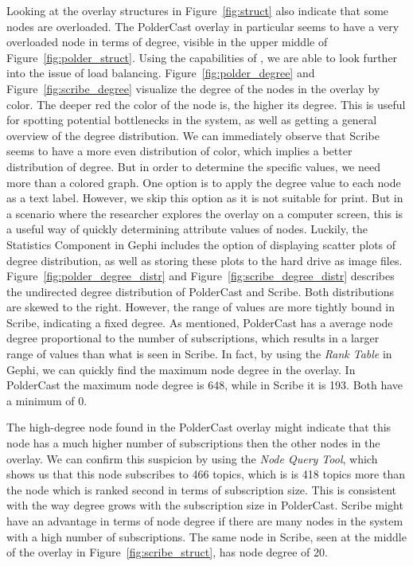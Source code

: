 Looking at the overlay structures in Figure~\ref{fig:struct} also
indicate that some nodes are overloaded. The PolderCast overlay in
particular seems to have a very overloaded node in terms of degree,
visible in the upper middle of Figure~\ref{fig:polder_struct}. Using
the capabilities of \demo{}, we are able to look further into the issue
of load balancing. Figure~\ref{fig:polder_degree} and
Figure~\ref{fig:scribe_degree} visualize the degree of the nodes in the
overlay by color. The deeper red the color of the node is, the higher
its degree. This is useful for spotting potential bottlenecks in the
system, as well as getting a general overview of the degree
distribution. We can immediately observe that Scribe seems to have a
more even distribution of color, which implies a better distribution of
degree. But in order to determine the specific values, we need more than
a colored graph. One option is to apply the degree value to each node as
a text label. However, we skip this option as it is not suitable for
print. But in a scenario where the researcher explores the overlay on a
computer screen, this is a useful way of quickly determining attribute
values of nodes. Luckily, the Statistics Component in Gephi includes the
option of displaying scatter plots of degree distribution, as well as
storing these plots to the hard drive as image files.
Figure~\ref{fig:polder_degree_distr} and
Figure~\ref{fig:scribe_degree_distr} describes the undirected degree
distribution of PolderCast and Scribe. Both distributions are skewed to
the right. However, the range of values are more tightly bound in
Scribe, indicating a fixed degree. As mentioned, PolderCast has a average node degree proportional
to the number of subscriptions, which results in a larger range of
values than what is seen in Scribe. In fact, by using the \emph{Rank
Table} in Gephi, we can quickly find the maximum node degree in the
overlay. In PolderCast the maximum node degree is 648, while in Scribe
it is 193. Both have a minimum of 0.

The high-degree node found in the PolderCast overlay might indicate that
this node has a much higher number of subscriptions then the other nodes
in the overlay. We can confirm this suspicion by using the \emph{Node
    Query Tool}, which shows us that this node subscribes to 466 topics,
which is is 418 topics more than the node which is ranked second in
terms of subscription size. This is consistent with the way degree grows
with the subscription size in PolderCast. Scribe might have an advantage
in terms of node degree if there are many nodes in the system with a
high number of subscriptions. The same node in Scribe, seen at the
middle of the overlay in Figure~\ref{fig:scribe_struct}, has node degree
of 20.

